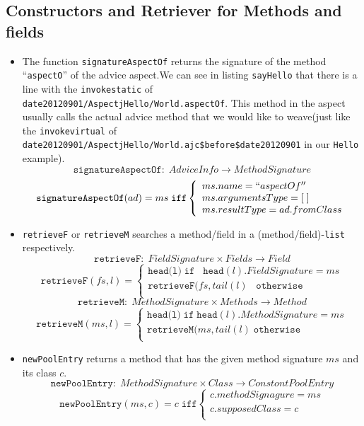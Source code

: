\subsection{Constructors and Retriever for Methods and fields}
\begin{itemize}
  \item
  The function \texttt{signatureAspectOf} returns the signature of the method ``\texttt{aspectO}'' of the advice aspect.We can see in listing \texttt{sayHello} that there is a line with the \texttt{invokestatic} of \\ \texttt{date20120901/AspectjHello/World.aspectOf}. This method in the aspect usually calls the actual advice method that we would like to weave(just like the \texttt{invokevirtual} of \\ \texttt{date20120901/AspectjHello/World.ajc\$before\$date20120901} in our \texttt{Hello} example).
$$\texttt{signatureAspectOf}:\; AdviceInfo\rightarrow MethodSignature$$
$$\texttt{signatureAspectOf}(ad)=ms\;\texttt{iff}\left\{
\begin{array}{l}
ms.name=``aspectOf''\\
ms.argumentsType=[\;]\\
ms.resultType=ad.fromClass\\
\end{array}\right.$$

  \item
  \texttt{retrieveF} or \texttt{retrieveM} searches a method/field in a (method/field)-\texttt{list} respectively.
$$\texttt{retrieveF}:\;FieldSignature\times Fields\rightarrow Field$$
$$\texttt{retrieveF}(fs,l)=\left\{
\begin{array}{l}
  \texttt{head(l)}\;\texttt{if}\;\;\; \texttt{head}(l).FieldSignature=ms\\
  \texttt{retrieveF}(fs,tail(l)\;\;\; \texttt{otherwise}\\
\end{array}\right.$$
$$\texttt{retrieveM}:\;MethodSignature\times Methods\rightarrow Method$$
$$\texttt{retrieveM}(ms,l)=\left\{
\begin{array}{l}
  \texttt{head(l)}\;\texttt{if}\; \texttt{head}(l).MethodSignature=ms\\
  \texttt{retrieveM}(ms,tail(l)\; \texttt{otherwise}\\
\end{array}\right.$$

\item
\texttt{newPoolEntry} returns a method that has the given method signature $ms$ and its class $c$.
$$\texttt{newPoolEntry} :\; MethodSignature\times Class\rightarrow ConstontPoolEntry$$
$$\texttt{newPoolEntry}(ms,c)=c \;\texttt{iff}\left\{
\begin{array}{l}
c.methodSignagure=ms\\
c.supposedClass=c\\
\end{array}
\right.$$

\end{itemize}

